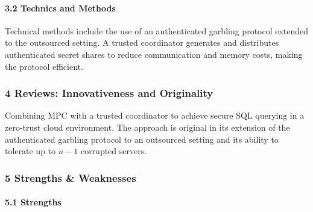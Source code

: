 \documentclass[
]{article}
\begin{document}
\paragraph{3.2 Technics and Methods}\label{32--technics-and-methods}

Technical methods include the use of an authenticated garbling protocol
extended to the outsourced setting. A trusted coordinator generates and
distributes authenticated secret shares to reduce communication and
memory costs, making the protocol efficient.

\subsubsection{\texorpdfstring{\textbf{4 Reviews: Innovativeness and
Originality}}{4 Reviews: Innovativeness and Originality}}\label{4--reviews-innovativeness-and-originality}

Combining MPC with a trusted coordinator to achieve secure SQL querying
in a zero-trust cloud environment. The approach is original in its
extension of the authenticated garbling protocol to an outsourced
setting and its ability to tolerate up to \( n-1 \) corrupted servers.

\subsubsection{\texorpdfstring{\textbf{5 Strengths \&
Weaknesses}}{5 Strengths \& Weaknesses}}\label{5--strengths--weaknesses}

\paragraph{5.1 Strengths}\label{51--strengths}
\end{document}
